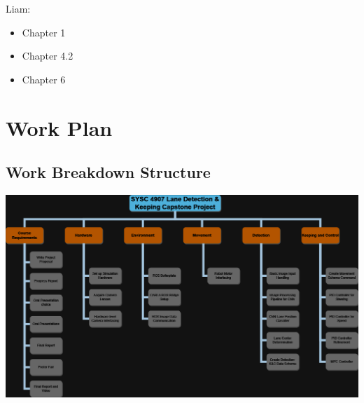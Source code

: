 \documentclass[titlepage]{article}
\begin{document}
Liam: 
\begin{itemize}
\item Chapter 1
\item Chapter 4.2
\item Chapter 6
\end{itemize}

\section{Work Plan}
\subsection{Work Breakdown Structure}
\includegraphics[width=10in,scale=1, angle=90, origin=c]{wbs.png}
\end{document}
